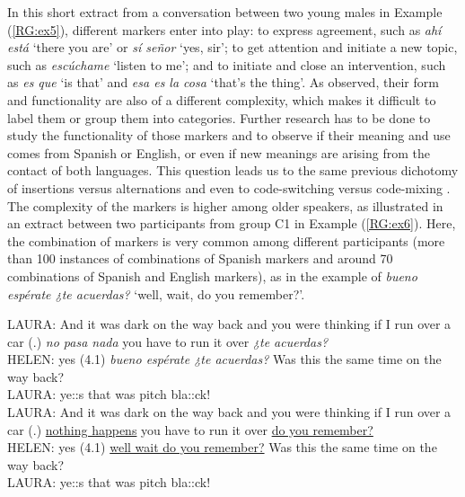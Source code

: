 \documentclass[output=paper]{langscibook}
\begin{document}
In this short extract from a conversation between two young males in Example (\ref{RG:ex5}), different markers enter into play: to express agreement, such as \textit{ahí está} ‘there you are’ or \textit{sí señor} ‘yes, sir’; to get attention and initiate a new topic, such as \textit{escúchame} ‘listen to me’; and to initiate and close an intervention, such as \textit{es que} ‘is that’ and \textit{esa es la cosa} ‘that’s the thing’. As observed, their form and functionality are also of a different complexity, which makes it difficult to label them or group them into categories. Further research has to be done to study the functionality of those markers and to observe if their meaning and use comes from Spanish or English, or even if new meanings are arising from the contact of both languages. This question leads us to the same previous dichotomy of insertions versus alternations and even to code-switching versus code-mixing \citep{auer_code-switching_1998}. The complexity of the markers is higher among older speakers, as illustrated in an extract between two participants from group C1 in Example (\ref{RG:ex6}). Here, the combination of markers is very common among different participants (more than 100 instances of combinations of Spanish markers and around 70 combinations of Spanish and English markers), as in the example of \textit{bueno espérate ¿te acuerdas?} ‘well, wait, do you remember?’.

\begin{exe}\ex\label{RG:ex6}
LAURA:  And it was dark on the way back and you were thinking if I run over a car (.) \textit{no pasa nada} you have to run it over \textit{¿te acuerdas?}\\
HELEN: yes (4.1) \textit{bueno espérate ¿te acuerdas?} Was this the same time on the way back?\\
LAURA: ye::s that was pitch bla::ck!\\

LAURA: And it was dark on the way back and you were thinking if I run over a car (.) \ul{nothing happens} you have to run it over \ul{do you remember?}\\
HELEN: yes (4.1) \ul{well wait do you remember?} Was this the same time on the way back?\\
LAURA: ye::s that was pitch bla::ck!
\end{exe}
\end{document}
